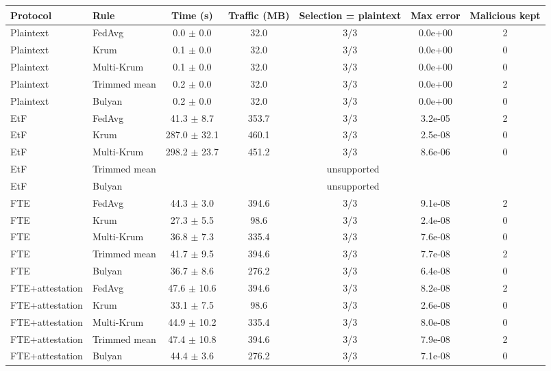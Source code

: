 \begin{tabular}{llccccc}
\toprule
Protocol & Rule & Time (s) & Traffic (MB) & Selection = plaintext & Max error & Malicious kept \\
\midrule
Plaintext & FedAvg & 0.0 $\pm$ 0.0 & 32.0 & 3/3 & 0.0e+00 & 2 \\
Plaintext & Krum & 0.1 $\pm$ 0.0 & 32.0 & 3/3 & 0.0e+00 & 0 \\
Plaintext & Multi-Krum & 0.1 $\pm$ 0.0 & 32.0 & 3/3 & 0.0e+00 & 0 \\
Plaintext & Trimmed mean & 0.2 $\pm$ 0.0 & 32.0 & 3/3 & 0.0e+00 & 2 \\
Plaintext & Bulyan & 0.2 $\pm$ 0.0 & 32.0 & 3/3 & 0.0e+00 & 0 \\
EtF & FedAvg & 41.3 $\pm$ 8.7 & 353.7 & 3/3 & 3.2e-05 & 2 \\
EtF & Krum & 287.0 $\pm$ 32.1 & 460.1 & 3/3 & 2.5e-08 & 0 \\
EtF & Multi-Krum & 298.2 $\pm$ 23.7 & 451.2 & 3/3 & 8.6e-06 & 0 \\
EtF & Trimmed mean & \multicolumn{5}{c}{unsupported} \\
EtF & Bulyan & \multicolumn{5}{c}{unsupported} \\
FTE & FedAvg & 44.3 $\pm$ 3.0 & 394.6 & 3/3 & 9.1e-08 & 2 \\
FTE & Krum & 27.3 $\pm$ 5.5 & 98.6 & 3/3 & 2.4e-08 & 0 \\
FTE & Multi-Krum & 36.8 $\pm$ 7.3 & 335.4 & 3/3 & 7.6e-08 & 0 \\
FTE & Trimmed mean & 41.7 $\pm$ 9.5 & 394.6 & 3/3 & 7.7e-08 & 2 \\
FTE & Bulyan & 36.7 $\pm$ 8.6 & 276.2 & 3/3 & 6.4e-08 & 0 \\
FTE+attestation & FedAvg & 47.6 $\pm$ 10.6 & 394.6 & 3/3 & 8.2e-08 & 2 \\
FTE+attestation & Krum & 33.1 $\pm$ 7.5 & 98.6 & 3/3 & 2.6e-08 & 0 \\
FTE+attestation & Multi-Krum & 44.9 $\pm$ 10.2 & 335.4 & 3/3 & 8.0e-08 & 0 \\
FTE+attestation & Trimmed mean & 47.4 $\pm$ 10.8 & 394.6 & 3/3 & 7.9e-08 & 2 \\
FTE+attestation & Bulyan & 44.4 $\pm$ 3.6 & 276.2 & 3/3 & 7.1e-08 & 0 \\
\bottomrule
\end{tabular}
